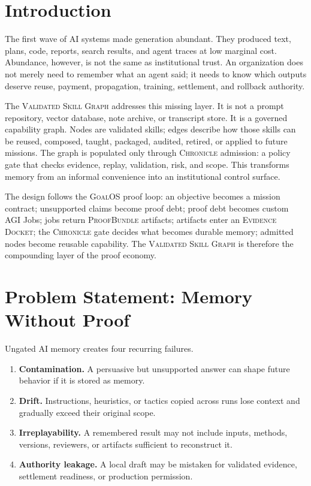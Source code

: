 \documentclass[10.5pt,oneside]{article}
\newcommand{\goalos}{\textsc{GoalOS}}
\newcommand{\vsg}{\textsc{Validated Skill Graph}}
\newcommand{\chronicle}{\textsc{Chronicle}}
\newcommand{\proofbundle}{\textsc{ProofBundle}}
\newcommand{\evidencedocket}{\textsc{Evidence Docket}}
\begin{document}
\section{Introduction}
The first wave of AI systems made generation abundant. They produced text, plans, code, reports, search results, and agent traces at low marginal cost. Abundance, however, is not the same as institutional trust. An organization does not merely need to remember what an agent said; it needs to know which outputs deserve reuse, payment, propagation, training, settlement, and rollback authority.

The \vsg{} addresses this missing layer. It is not a prompt repository, vector database, note archive, or transcript store. It is a governed capability graph. Nodes are validated skills; edges describe how those skills can be reused, composed, taught, packaged, audited, retired, or applied to future missions. The graph is populated only through \chronicle{} admission: a policy gate that checks evidence, replay, validation, risk, and scope. This transforms memory from an informal convenience into an institutional control surface.

The design follows the \goalos{} proof loop: an objective becomes a mission contract; unsupported claims become proof debt; proof debt becomes custom AGI Jobs; jobs return \proofbundle{} artifacts; artifacts enter an \evidencedocket{}; the \chronicle{} gate decides what becomes durable memory; admitted nodes become reusable capability. The \vsg{} is therefore the compounding layer of the proof economy.

\section{Problem Statement: Memory Without Proof}
Ungated AI memory creates four recurring failures.

\begin{enumerate}
  \item \textbf{Contamination.} A persuasive but unsupported answer can shape future behavior if it is stored as memory.
  \item \textbf{Drift.} Instructions, heuristics, or tactics copied across runs lose context and gradually exceed their original scope.
  \item \textbf{Irreplayability.} A remembered result may not include inputs, methods, versions, reviewers, or artifacts sufficient to reconstruct it.
  \item \textbf{Authority leakage.} A local draft may be mistaken for validated evidence, settlement readiness, or production permission.
\end{enumerate}
\end{document}
